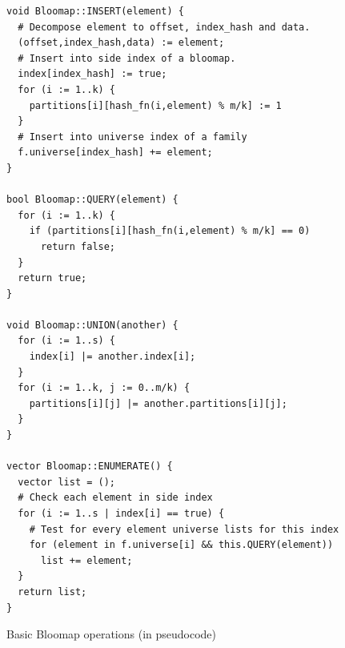 \begin{figure}[!ht]
\begin{tcolorbox}
\begin{verbatim}
void Bloomap::INSERT(element) {
  # Decompose element to offset, index_hash and data.
  (offset,index_hash,data) := element;
  # Insert into side index of a bloomap.
  index[index_hash] := true;
  for (i := 1..k) {
    partitions[i][hash_fn(i,element) % m/k] := 1
  }
  # Insert into universe index of a family
  f.universe[index_hash] += element;
}

bool Bloomap::QUERY(element) {
  for (i := 1..k) {
    if (partitions[i][hash_fn(i,element) % m/k] == 0)
      return false;
  }
  return true;
}

void Bloomap::UNION(another) {
  for (i := 1..s) {
    index[i] |= another.index[i];
  }
  for (i := 1..k, j := 0..m/k) {
    partitions[i][j] |= another.partitions[i][j];
  }
}

vector Bloomap::ENUMERATE() {
  vector list = ();
  # Check each element in side index
  for (i := 1..s | index[i] == true) {
    # Test for every element universe lists for this index
    for (element in f.universe[i] && this.QUERY(element)) 
      list += element;
  }
  return list;
}

\end{verbatim}
\end{tcolorbox}
\caption{Basic Bloomap operations (in pseudocode)}
\label{figure-bloomap-fn}
\end{figure}
